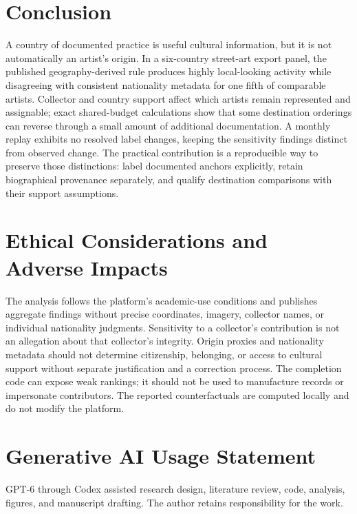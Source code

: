 \section{Conclusion}
A country of documented practice is useful cultural information, but it is not automatically an artist's origin. In a six-country street-art export panel, the published geography-derived rule produces highly local-looking activity while disagreeing with consistent nationality metadata for one fifth of comparable artists. Collector and country support affect which artists remain represented and assignable; exact shared-budget calculations show that some destination orderings can reverse through a small amount of additional documentation. A monthly replay exhibits no resolved label changes, keeping the sensitivity findings distinct from observed change. The practical contribution is a reproducible way to preserve those distinctions: label documented anchors explicitly, retain biographical provenance separately, and qualify destination comparisons with their support assumptions.

\clearpage
\section*{Ethical Considerations and Adverse Impacts}
The analysis follows the platform's academic-use conditions and publishes aggregate findings without precise coordinates, imagery, collector names, or individual nationality judgments. Sensitivity to a collector's contribution is not an allegation about that collector's integrity. Origin proxies and nationality metadata should not determine citizenship, belonging, or access to cultural support without separate justification and a correction process. The completion code can expose weak rankings; it should not be used to manufacture records or impersonate contributors. The reported counterfactuals are computed locally and do not modify the platform.

\section*{Generative AI Usage Statement}
GPT-6 through Codex assisted research design, literature review, code, analysis, figures, and manuscript drafting. The author retains responsibility for the work.

\clearpage



